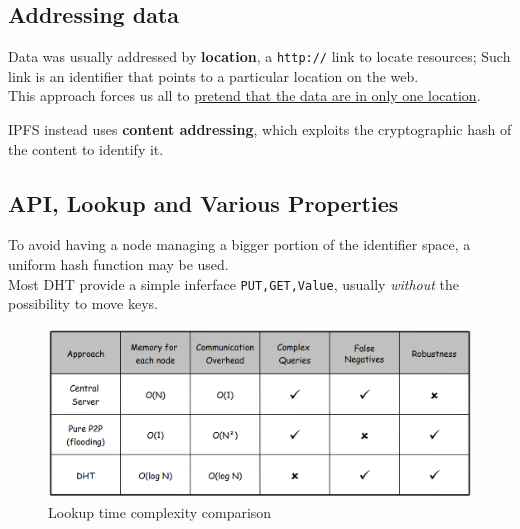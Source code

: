 \subsection{Addressing data}
Data was usually addressed by \textbf{location}, a \texttt{http://} link to locate resources;
Such link is an identifier that points to a particular location on the web.\\
This approach forces us all to \ul{pretend that the data are in only one location}.

IPFS instead uses \textbf{content addressing}, which exploits the cryptographic hash of the content to identify it.

\subsection{API, Lookup and Various Properties}
To avoid having a node managing a bigger portion of the identifier space, a uniform hash function may be used.\\
Most DHT provide a simple inferface \texttt{PUT,GET,Value}, usually \textit{without} the possibility to move keys.

\begin{figure}[htbp]
   \centering
   \includegraphics{images/DHT_lookupcomplexity.png}
   \caption{Lookup time complexity comparison}
   \label{fig:DHT_lookupcomplexity}
\end{figure}


